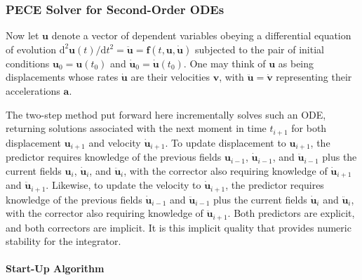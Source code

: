 \subsubsection{PECE Solver for Second-Order ODEs}
\label{sec:2ndOrderPECE}

Now let $\mathbf{u}$ denote a vector of dependent variables obeying a differential equation of evolution $\mathrm{d}^2 \mathbf{u}(t) / \mathrm{d} t^2 = \ddot{\mathbf{u}} = \mathbf{f} (t, \mathbf{u}, \dot{\mathbf{u}})$ subjected to the pair of initial conditions $\mathbf{u}_0 = \mathbf{u}(t_0)$ and $\dot{\mathbf{u}}_0 = \dot{\mathbf{u}}(t_0)$.  One may think of $\mathbf{u}$ as being displacements whose rates $\dot{\mathbf{u}}$ are their velocities $\mathbf{v}$, with $\ddot{\mathbf{u}} = \dot{\mathbf{v}}$ representing their accelerations $\mathbf{a}$. 

The two-step method put forward here incrementally solves such an ODE, returning solutions associated with the next moment in time $t_{i+1}$ for both displacement $\mathbf{u}_{i+1}$ and velocity $\dot{\mathbf{u}}_{i+1}$.  To update displacement to $\mathbf{u}_{i+1}$, the predictor requires knowledge of the previous fields $\mathbf{u}_{i-1}$, $\dot{\mathbf{u}}_{i-1}$, and $\ddot{\mathbf{u}}_{i-1}$ plus the current fields $\mathbf{u}_i$, $\dot{\mathbf{u}}_i$, and $\ddot{\mathbf{u}}_i$, with the corrector also requiring knowledge of $\dot{\mathbf{u}}_{i+1}$ and $\ddot{\mathbf{u}}_{i+1}$.  Likewise, to update the velocity to $\dot{\mathbf{u}}_{i+1}$, the predictor requires knowledge of the previous fields $\dot{\mathbf{u}}_{i-1}$ and $\ddot{\mathbf{u}}_{i-1}$ plus the current fields $\dot{\mathbf{u}}_i$ and $\ddot{\mathbf{u}}_i$, with the corrector also requiring knowledge of $\ddot{\mathbf{u}}_{i+1}$.  Both predictors are explicit, and both correctors are implicit.  It is this implicit quality that provides numeric stability for the integrator.

\paragraph{Start-Up Algorithm}

